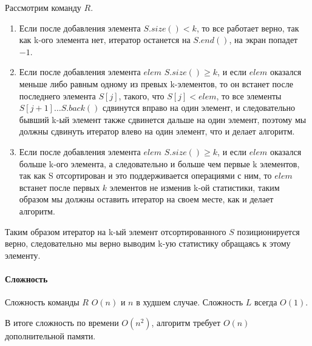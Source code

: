 \documentclass[12pt]{article}
\begin{document}
Рассмотрим команду $ R $.
\begin{enumerate}
    \item Если после добавления элемента $ S.size() < k $, то все работает
          верно, так как k-ого элемента нет, итератор останется на
          $ S.end() $, на экран попадет $ -1 $.
    \item Если после добавления элемента $ elem $ $ S.size() \ge k $,
          и если $ elem $ оказался меньше либо равным одному из превых
          k-элементов, то он встанет после последнего элемента $ S[j] $,
          такого, что $ S[j] < elem $, то все элементы $ S[j + 1] \dots
          S.back() $ сдвинутся вправо на один элемент, и следовательно
          бывший k-ый элемент также сдвинется дальше на один элемент,
          поэтому мы должны сдвинуть итератор влево на один элемент, что
          и делает алгоритм.
    \item Если после добавления элемента $ elem $ $ S.size() \ge k $,
          и если $ elem $ оказался больше k-ого элемента, а следовательно
          и больше чем первые k элементов, так как S отсортирован и это
          поддерживается операциями с ним, то $ elem $ встанет после
          первых $ k $ элементов не изменив k-ой статистики, таким образом
          мы должны оставить итератор на своем месте, как и делает алгоритм.
\end{enumerate}

Таким образом итератор на k-ый элемент отсортированного $ S $ позиционируется
верно, следовательно мы верно выводим k-ую статистику обращаясь к этому
элементу.


\paragraph{Сложность}
Сложность команды $ R $ $ O(n) $ и $ n $ в худшем случае.
Сложность $ L $ всегда $ O(1) $.

В итоге сложность по времени $ O(n^2) $, алгоритм требует $ O(n) $
дополнительной памяти.
\end{document}
